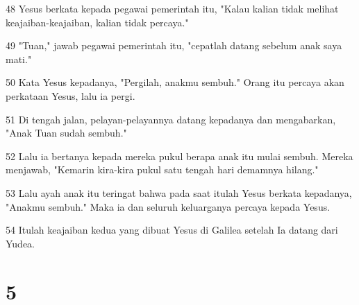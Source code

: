\par 48 Yesus berkata kepada pegawai pemerintah itu, "Kalau kalian tidak melihat keajaiban-keajaiban, kalian tidak percaya."
\par 49 "Tuan," jawab pegawai pemerintah itu, "cepatlah datang sebelum anak saya mati."
\par 50 Kata Yesus kepadanya, "Pergilah, anakmu sembuh." Orang itu percaya akan perkataan Yesus, lalu ia pergi.
\par 51 Di tengah jalan, pelayan-pelayannya datang kepadanya dan mengabarkan, "Anak Tuan sudah sembuh."
\par 52 Lalu ia bertanya kepada mereka pukul berapa anak itu mulai sembuh. Mereka menjawab, "Kemarin kira-kira pukul satu tengah hari demamnya hilang."
\par 53 Lalu ayah anak itu teringat bahwa pada saat itulah Yesus berkata kepadanya, "Anakmu sembuh." Maka ia dan seluruh keluarganya percaya kepada Yesus.
\par 54 Itulah keajaiban kedua yang dibuat Yesus di Galilea setelah Ia datang dari Yudea.

\chapter{5}

